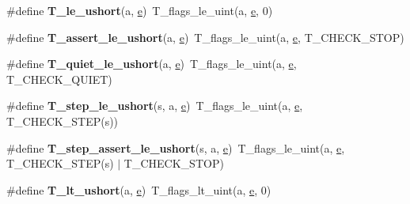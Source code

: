 \begin{DoxyCompactItemize}
\#define {\bfseries T\+\_\+le\+\_\+ushort}(a,  \mbox{\hyperlink{sun4u_2tte_8h_a8b0b9ed08e0e18920ec2682f48228c27}{e}})~T\+\_\+flags\+\_\+le\+\_\+uint(a, \mbox{\hyperlink{sun4u_2tte_8h_a8b0b9ed08e0e18920ec2682f48228c27}{e}}, 0)
\item 
\mbox{\label{group__RTEMSTestFrameworkChecksUShort_ga953e6b260f5f799bc6ac3674190b0ca5}} 
\#define {\bfseries T\+\_\+assert\+\_\+le\+\_\+ushort}(a,  \mbox{\hyperlink{sun4u_2tte_8h_a8b0b9ed08e0e18920ec2682f48228c27}{e}})~T\+\_\+flags\+\_\+le\+\_\+uint(a, \mbox{\hyperlink{sun4u_2tte_8h_a8b0b9ed08e0e18920ec2682f48228c27}{e}}, T\+\_\+\+C\+H\+E\+C\+K\+\_\+\+S\+T\+OP)
\item 
\mbox{\label{group__RTEMSTestFrameworkChecksUShort_ga5ae5d5c63ff9ef0cf3502e76c96ccbbd}} 
\#define {\bfseries T\+\_\+quiet\+\_\+le\+\_\+ushort}(a,  \mbox{\hyperlink{sun4u_2tte_8h_a8b0b9ed08e0e18920ec2682f48228c27}{e}})~T\+\_\+flags\+\_\+le\+\_\+uint(a, \mbox{\hyperlink{sun4u_2tte_8h_a8b0b9ed08e0e18920ec2682f48228c27}{e}}, T\+\_\+\+C\+H\+E\+C\+K\+\_\+\+Q\+U\+I\+ET)
\item 
\mbox{\label{group__RTEMSTestFrameworkChecksUShort_gab6abc10b848d30c7c098dd69ca0281f3}} 
\#define {\bfseries T\+\_\+step\+\_\+le\+\_\+ushort}(s,  a,  \mbox{\hyperlink{sun4u_2tte_8h_a8b0b9ed08e0e18920ec2682f48228c27}{e}})~T\+\_\+flags\+\_\+le\+\_\+uint(a, \mbox{\hyperlink{sun4u_2tte_8h_a8b0b9ed08e0e18920ec2682f48228c27}{e}}, T\+\_\+\+C\+H\+E\+C\+K\+\_\+\+S\+T\+EP(s))
\item 
\mbox{\label{group__RTEMSTestFrameworkChecksUShort_ga513ac30673417b1f161392f7729434f1}} 
\#define {\bfseries T\+\_\+step\+\_\+assert\+\_\+le\+\_\+ushort}(s,  a,  \mbox{\hyperlink{sun4u_2tte_8h_a8b0b9ed08e0e18920ec2682f48228c27}{e}})~T\+\_\+flags\+\_\+le\+\_\+uint(a, \mbox{\hyperlink{sun4u_2tte_8h_a8b0b9ed08e0e18920ec2682f48228c27}{e}}, T\+\_\+\+C\+H\+E\+C\+K\+\_\+\+S\+T\+EP(s) $\vert$ T\+\_\+\+C\+H\+E\+C\+K\+\_\+\+S\+T\+OP)
\item 
\mbox{\label{group__RTEMSTestFrameworkChecksUShort_gaeacc502d225eabde13ff277550f375ec}} 
\#define {\bfseries T\+\_\+lt\+\_\+ushort}(a,  \mbox{\hyperlink{sun4u_2tte_8h_a8b0b9ed08e0e18920ec2682f48228c27}{e}})~T\+\_\+flags\+\_\+lt\+\_\+uint(a, \mbox{\hyperlink{sun4u_2tte_8h_a8b0b9ed08e0e18920ec2682f48228c27}{e}}, 0)

\end{DoxyCompactItemize}
